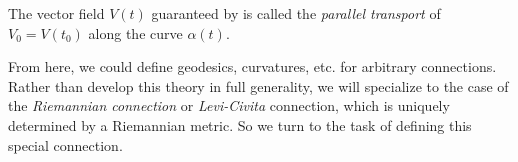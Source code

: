 \begin{definition}\label{def:parallel transport}
	The vector field $V(t)$ guaranteed by  is called the \emph{parallel transport} of $V_0 = V(t_0)$ along the curve $\alpha(t)$.
\end{definition}

From here, we could define geodesics, curvatures, etc. for arbitrary connections. Rather than develop this theory in full generality, we will specialize to the case of the \emph{Riemannian connection} or \emph{Levi-Civita} connection, which is uniquely determined by a Riemannian metric. So we turn to the task of defining this special connection.